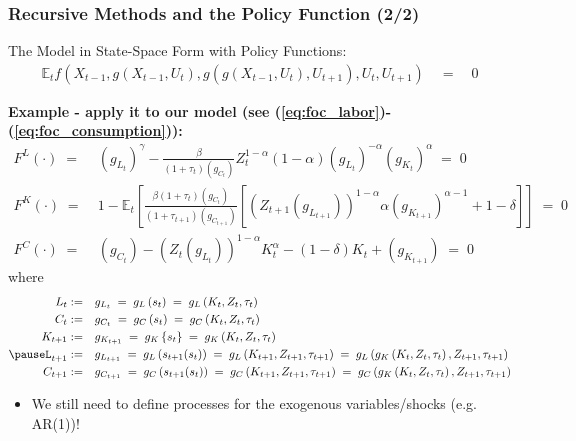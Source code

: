 \documentclass[10pt,c,aspectratio=1610,handout]{beamer}
\begin{document}
\begin{frame}%
  \frametitle{Recursive Methods and the Policy Function (2/2)}%
  \begin{block}{The Model in State-Space Form with Policy Functions:}%
    \vspace*{-0.1in}%
    \begin{align*}%
      \mathbb{E}_t f \left(X_{t-1},g\left(X_{t-1},U_t\right),g\left(g\left(X_{t-1},U_t\right),U_{t+1}\right),U_t,U_{t+1}\right) \quad = \quad 0%
    \end{align*}%
  \end{block}%
  \pause%
  \begin{footnotesize}%
    \textbf{Example - apply it to our model (see (\ref{eq:foc_labor})-(\ref{eq:foc_consumption})):}%
    \begin{align}%
      F^L(\cdot) \; = & \; (g_{L_t})^{\gamma} - \frac{\beta}{\left(1+\tau_t\right) (g_{C_t})} Z_t^{1-\alpha} \left(1-\alpha\right) (g_{L_t})^{-\alpha} (g_{K_t})^{\alpha} \; = \; 0\\%
      F^K(\cdot) \; = & \; 1 - \mathbb{E}_t \left[ \frac{\beta\left(1+\tau_t\right)(g_{C_t})}{\left(1+\tau_{t+1}\right)(g_{C_{t+1}})} \left[ \left(Z_{t+1}(g_{L_{t+1}})\right)^{1-\alpha} \alpha (g_{K_{t+1}})^{\alpha-1} + 1 - \delta \right] \right] \; = \; 0\\%
      F^C(\cdot) \; = & \; (g_{C_t}) - \left(Z_t (g_{L_t})\right)^{1-\alpha} K_t^\alpha - (1-\delta) K_t + (g_{K_{t+1}}) \; = \; 0%
    \end{align}%
    \pause%
    where%
    \begin{align*}%
      L_t:= & \quad g_{L_t} \; = \; g_L \left(s_t\right) \; = \; g_L \left( K_t, Z_t, \tau_t \right)\\%
      C_t:= & \quad g_{C_t} \; = \; g_C \left(s_t\right) \; = \; g_C \left( K_t, Z_t, \tau_t \right)\\%
      K_{t+1}:= & \quad g_{K_{t+1}} \; = \; g_K \left\{s_t\right\} \; = \; g_K \left( K_t, Z_t, \tau_t \right)\\%
      \pause%
      L_{t+1}:= & \quad g_{L_{t+1}} \; = \; g_L \left(s_{t+1}(s_t)\right) \; = \; g_L \left(K_{t+1},Z_{t+1},\tau_{t+1}\right) \; = \; g_L \left(g_K \left( K_t, Z_t, \tau_t \right),Z_{t+1},\tau_{t+1}\right)\\%
      C_{t+1}:= & \quad  g_{C_{t+1}} \; = \; g_C \left(s_{t+1}(s_t)\right) \; = \; g_C \left(K_{t+1},Z_{t+1},\tau_{t+1}\right) \; = \; g_C \left(g_K \left( K_t, Z_t, \tau_t \right),Z_{t+1},\tau_{t+1}\right)%
    \end{align*}%
    \vspace*{-0.2in}%
    \pause%
    \begin{itemize}%
      \item[$\rightarrow$] We still need to define processes for the exogenous variables/shocks (e.g. AR(1))!%
    \end{itemize}%
  \end{footnotesize}%
\end{frame}%
\end{document}
